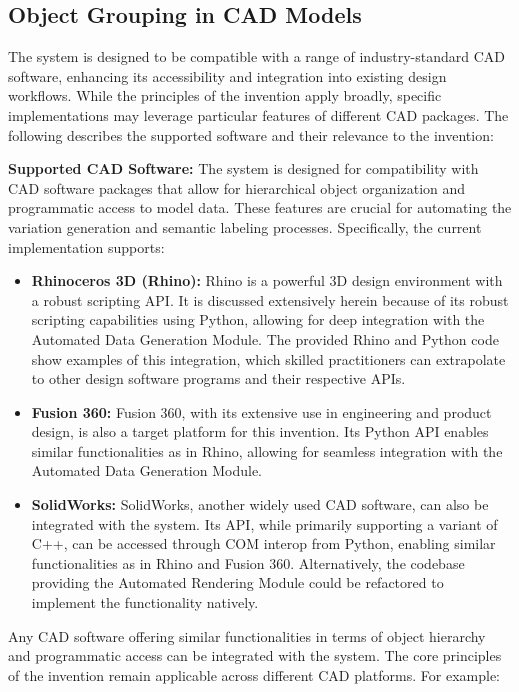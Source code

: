 \documentclass[12pt]{report}
\begin{document}
\subsection{Object Grouping in CAD Models}

The system is designed to be compatible with a range of industry-standard CAD software, enhancing its accessibility and integration into existing design workflows. While the principles of the invention apply broadly, specific implementations may leverage particular features of different CAD packages. The following describes the supported software and their relevance to the invention:

\textbf{Supported CAD Software:} The system is designed for compatibility with CAD software packages that allow for hierarchical object organization and programmatic access to model data. These features are crucial for automating the variation generation and semantic labeling processes. Specifically, the current implementation supports:

\begin{itemize}
    \item \textbf{Rhinoceros 3D (Rhino):} Rhino is a powerful 3D design environment with a robust scripting API. It is discussed extensively herein because of its robust scripting capabilities using Python, allowing for deep integration with the Automated Data Generation Module. The provided Rhino and Python code show examples of this integration, which skilled practitioners can extrapolate to other design software programs and their respective APIs. 
    \item \textbf{Fusion 360:} Fusion 360, with its extensive use in engineering and product design, is also a target platform for this invention. Its Python API enables similar functionalities as in Rhino, allowing for seamless integration with the Automated Data Generation Module.
    \item \textbf{SolidWorks:} SolidWorks, another widely used CAD software, can also be integrated with the system. Its API, while primarily supporting a variant of C++, can be accessed through COM interop from Python, enabling similar functionalities as in Rhino and Fusion 360. Alternatively, the codebase providing the Automated Rendering Module could be refactored to implement the functionality natively.
\end{itemize}

Any CAD software offering similar functionalities in terms of object hierarchy and programmatic access can be integrated with the system. The core principles of the invention remain applicable across different CAD platforms. For example:
\end{document}
